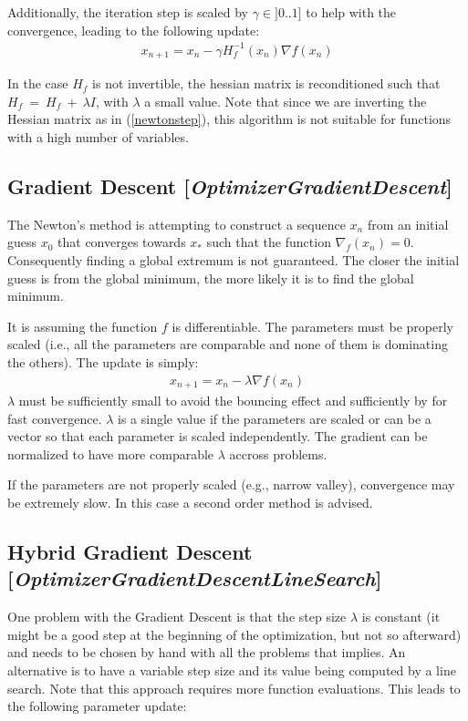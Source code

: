 \documentclass[11pt]{article}
\newcommand{\nllref}[1]{[\small{\textit{#1}}]}
\begin{document}
Additionally, the iteration step is scaled by $\gamma \in ]0..1]$ to help with the convergence, leading to the following update:
\begin{align}
x_{n+1} = x_n - \gamma H_f^{-1}(x_n) \nabla{f}(x_n) \label{newtonstep}
\end{align}

In the case $H_f$ is not invertible, the hessian matrix is reconditioned such that $H_f~=~H_f~+~\lambda I$, with $\lambda$ a small value. Note that since we are inverting the Hessian matrix as in (\ref{newtonstep}), this algorithm is not suitable for functions with a high number of variables.

\subsection{Gradient Descent \nllref{OptimizerGradientDescent}}
The Newton's method is attempting to construct a sequence $x_n$ from an initial guess $x_0$ that converges towards $x_*$ such that the function $\nabla_f(x_n)=0$. Consequently finding a global extremum is not guaranteed. The closer the initial guess is from the global minimum, the more likely it is to find the global minimum.

It is assuming the function $f$ is differentiable. The parameters must be properly scaled (i.e., all the parameters are comparable and none of them is dominating the others). The update is simply:
\begin{align}
x_{n+1} = x_n - \lambda \nabla{f}(x_n) \label{gradientstep}
\end{align}
$\lambda$ must be sufficiently small to avoid the bouncing effect and sufficiently by for fast convergence. $\lambda$ is a single value if the parameters are scaled or can be a vector so that each parameter is scaled independently. The gradient can be normalized to have more comparable $\lambda$ accross problems.

If the parameters are not properly scaled (e.g., narrow valley), convergence may be extremely slow. In this case a second order method is advised.

\subsection{Hybrid Gradient Descent \nllref{OptimizerGradientDescentLineSearch}}
One problem with the Gradient Descent is that the step size $\lambda$ is constant (it might be a good step at the beginning of the optimization, but not so afterward) and needs to be chosen by hand with all the problems that implies. An alternative is to have a variable step size and its value being computed by a line search. Note that this approach requires more function evaluations. This leads to the following parameter update:
\end{document}
